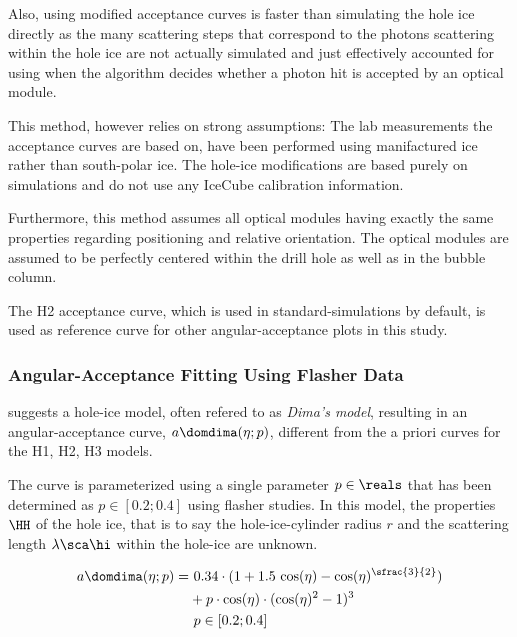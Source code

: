 Also, using modified acceptance curves is faster than simulating the hole ice directly as the many scattering steps that correspond to the photons scattering within the hole ice are not actually simulated and just effectively accounted for using when the algorithm decides whether a photon hit is accepted by an optical module.

This method, however relies on strong assumptions: The lab measurements the acceptance curves are based on, have been performed using manifactured ice rather than south-polar ice. The hole-ice modifications are based purely on simulations and do not use any IceCube calibration information.

Furthermore, this method assumes all optical modules having exactly the same properties regarding positioning and relative orientation. The optical modules are assumed to be perfectly centered within the drill hole as well as in the bubble column.

The H2 acceptance curve, which is used in standard-\clsim simulations by default, is used as reference curve for other angular-acceptance plots in this study.


\subsubsection{Angular-Acceptance Fitting Using Flasher Data}
\label{sec:dimas_model}

%
%
%
%
\chirkin suggests a hole-ice model, often refered to as \textit{Dima's model}, resulting in an angular-acceptance curve, $a\domdima(\eta;p)$, different from the a priori curves for the H1, H2, H3 models.\cite{flasherdataderivedicemodels}

The curve is parameterized using a single parameter $p\in\reals$ that has been determined as $p \in [0.2;0.4]$ using flasher studies. \cite{msuforwardholeice} In this model, the properties $\HH$ of the hole ice, that is to say the hole-ice-cylinder radius $r$ and the scattering length $\lambda\sca\hi$ within the hole-ice are unknown.

\begin{align}
  a\domdima(\eta;p) = & \ 0.34 \cdot (1 + 1.5\,\cos(\eta) - \cos(\eta)^{\sfrac{3}{2}}) \nonumber \\
      & + p \cdot \cos(\eta) \cdot  (\cos(\eta)^2 - 1)^3 \\
      & \ p \in [0.2;0.4] \nonumber
  \label{eq:adima}
\end{align}

